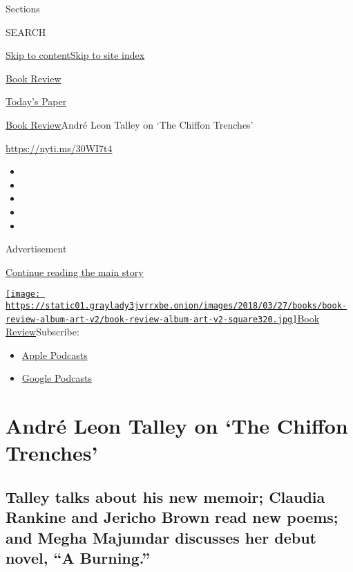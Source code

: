 Sections

SEARCH

\protect\hyperlink{site-content}{Skip to
content}\protect\hyperlink{site-index}{Skip to site index}

\href{https://www.nytimes3xbfgragh.onion/section/books/review}{Book
Review}

\href{https://myaccount.nytimes3xbfgragh.onion/auth/login?response_type=cookie\&client_id=vi}{}

\href{https://www.nytimes3xbfgragh.onion/section/todayspaper}{Today's
Paper}

\href{/section/books/review}{Book Review}\textbar{}André Leon Talley on
`The Chiffon Trenches'

\url{https://nyti.ms/30WI7t4}

\begin{itemize}
\item
\item
\item
\item
\item
\end{itemize}

Advertisement

\protect\hyperlink{after-top}{Continue reading the main story}

\href{https://www.nytimes3xbfgragh.onion/column/book-review-podcast}{\texttt{[image: https://static01.graylady3jvrrxbe.onion/images/2018/03/27/books/book-review-album-art-v2/book-review-album-art-v2-square320.jpg]}Book
Review}Subscribe:

\begin{itemize}
\tightlist
\item
  \href{https://itunes.apple.com/us/podcast/id120315179}{Apple Podcasts}
\item
  \href{https://www.google.com/podcasts?feed=aHR0cHM6Ly9yc3MuYXJ0MTkuY29tL2Jvb2stcmV2aWV3}{Google
  Podcasts}
\end{itemize}

\hypertarget{andruxe9-leon-talley-on-the-chiffon-trenches}{%
\section{André Leon Talley on `The Chiffon
Trenches'}\label{andruxe9-leon-talley-on-the-chiffon-trenches}}

\hypertarget{talley-talks-about-his-new-memoir-claudia-rankine-and-jericho-brown-read-new-poems-and-megha-majumdar-discusses-her-debut-novel-a-burning}{%
\subsection{Talley talks about his new memoir; Claudia Rankine and
Jericho Brown read new poems; and Megha Majumdar discusses her debut
novel, ``A
Burning.''}\label{talley-talks-about-his-new-memoir-claudia-rankine-and-jericho-brown-read-new-poems-and-megha-majumdar-discusses-her-debut-novel-a-burning}}

